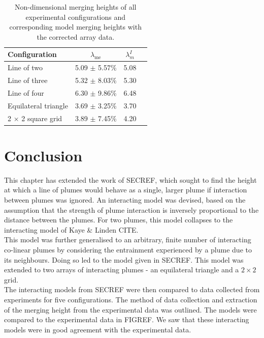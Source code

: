 \documentclass{jfm}
\begin{document}
	\begin{table}
		\centering
		\begin{tabular}{lccc}
			Configuration & $\lambda_{\text{me}}$ & $\lambda_{m}^I$\\ [-5pt] \hline
			Line of two & 5.09 $\pm$ 5.57\% & 5.08\\
			Line of three & 5.32 $\pm$ 8.03\% & 5.30\\
			Line of four & 6.30 $\pm$ 9.86\% & 6.48\\
			Equilateral triangle & 3.69 $\pm$ 3.25\% & 3.70\\
			2 $\times$ 2 square grid & 3.89 $\pm$ 7.45\% & 4.20\\
		\end{tabular}
		\caption{ Non-dimensional merging heights of all experimental configurations and corresponding model merging heights with the corrected array data.}
		\label{table:non-dimensional experimental merging heights with correction}
	\end{table}
	\section{Conclusion}
This chapter has extended the work of SECREF, which sought to find the height at which a line of plumes would behave as a single, larger plume if interaction between plumes was ignored. An interacting model was devised, based on the assumption that the strength of plume interaction is inversely proportional to the distance between the plumes. For two plumes, this model collapses to the interacting model of Kaye \& Linden CITE. \\

\noindent This model was further generalised to an arbitrary, finite number of interacting co-linear plumes by considering the entrainment experienced by a plume due to its neighbours. Doing so led to the model given in SECREF. This model was extended to two arrays of interacting plumes - an equilateral triangle and a $2 \times 2$ grid. \\

\noindent The interacting models from SECREF were then compared to data collected from experiments for five configurations. The method of data collection and extraction of the merging height from the experimental data was outlined. The models were compared to the experimental data in FIGREF. We saw that these interacting models were in good agreement with the experimental data. 


\end{document}
